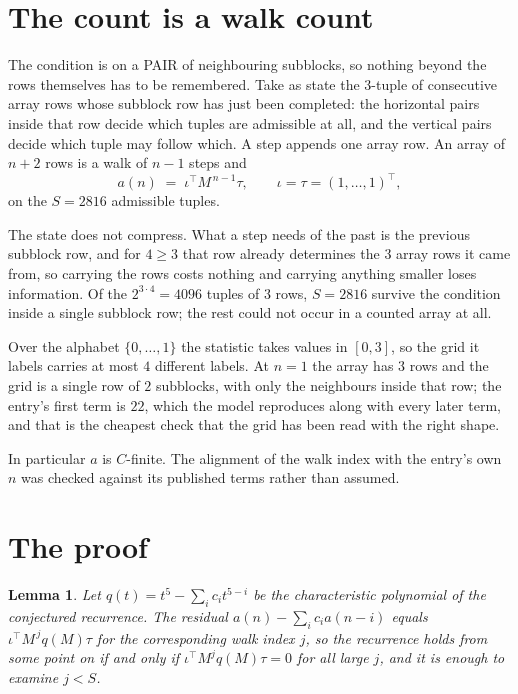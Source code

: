 \documentclass[11pt,a4paper]{article}
\theoremstyle{plain}
\newtheorem{lemma}[theorem]{Lemma}
\theoremstyle{definition}
\begin{document}
\section{The count is a walk count}

The condition is on a PAIR of neighbouring subblocks, so nothing beyond the
rows themselves has to be remembered. Take as state the $3$-tuple of consecutive array rows
whose subblock row has just been completed: the horizontal pairs inside that row decide which
tuples are admissible at all, and the vertical pairs decide which tuple may follow which. A
step appends one array row. An array of $n+2$ rows is a walk of $n-1$ steps and
\[
a(n)\;=\;\iota^{\!\top}M^{\,n-1}\tau,\qquad\iota=\tau=(1,\dots,1)^{\!\top},
\]
on the $S=2816$ admissible tuples.

The state does not compress. What a step needs of the past is the previous subblock row, and
for $4\ge3$ that row already determines the $3$ array rows it came from, so carrying the
rows costs nothing and carrying anything smaller loses information. Of the $2^{3\cdot
4}=4096$ tuples of $3$ rows, $S=2816$ survive the condition inside a single subblock row;
the rest could not occur in a counted array at all.

Over the alphabet $\{0,\dots,1\}$ the statistic takes values in $[0,3]$, so the
grid it labels carries at most $4$ different labels. At $n=1$ the array has $3$
rows and the grid is a single row of $2$
subblocks, with only the neighbours inside that row; the entry's first term is
$22$, which the model reproduces along with every later term, and that is the cheapest
check that the grid has been read with the right shape.

In particular $a$ is $C$-finite. The alignment of the walk index with the entry's own $n$ was
checked against its published terms rather than assumed.

\section{The proof}

\begin{lemma}\label{lem:crit}
Let $q(t)=t^{5}-\sum_i c_it^{5-i}$ be the characteristic polynomial of the
conjectured recurrence. The residual $a(n)-\sum_ic_ia(n-i)$ equals
$\iota^{\!\top}M^{\,j}q(M)\tau$ for the corresponding walk index $j$, so the recurrence
holds from some point on if and only if $\iota^{\!\top}M^{j}q(M)\tau=0$ for all large $j$,
and it is enough to examine $j<S$.
\end{lemma}
\end{document}
